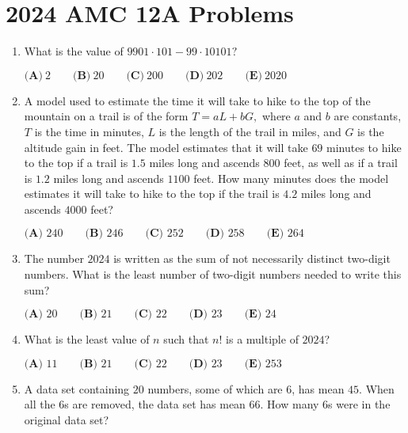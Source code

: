 \documentclass{article}
\begin{document}
\newpage\section*{2024 AMC 12A Problems}

\begin{enumerate}[label=\arabic*., itemsep=0.5em]
\item What is the value of \(9901\cdot101-99\cdot10101?\)

\(\textbf{(A)}~2\qquad\textbf{(B)}~20\qquad\textbf{(C)}~200\qquad\textbf{(D)}~202\qquad\textbf{(E)}~2020\)\par \vspace{0.5em}\item A model used to estimate the time it will take to hike to the top of the mountain on a trail is of the form \(T=aL+bG,\) where \(a\) and \(b\) are constants, \(T\) is the time in minutes, \(L\) is the length of the trail in miles, and \(G\) is the altitude gain in feet. The model estimates that it will take \(69\) minutes to hike to the top if a trail is \(1.5\) miles long and ascends \(800\) feet, as well as if a trail is \(1.2\) miles long and ascends \(1100\) feet. How many minutes does the model estimates it will take to hike to the top if the trail is \(4.2\) miles long and ascends \(4000\) feet?

\(\textbf{(A) }240\qquad\textbf{(B) }246\qquad\textbf{(C) }252\qquad\textbf{(D) }258\qquad\textbf{(E) }264\)\par \vspace{0.5em}\item The number \(2024\) is written as the sum of not necessarily distinct two-digit numbers. What is the least number of two-digit numbers needed to write this sum?

\(\textbf{(A) }20\qquad\textbf{(B) }21\qquad\textbf{(C) }22\qquad\textbf{(D) }23\qquad\textbf{(E) }24\)\par \vspace{0.5em}\item What is the least value of \(n\) such that \(n!\) is a multiple of \(2024\)?

\(
\textbf{(A) }11 \qquad
\textbf{(B) }21 \qquad
\textbf{(C) }22 \qquad
\textbf{(D) }23 \qquad
\textbf{(E) }253 \qquad
\)\par \vspace{0.5em}\item A data set containing \(20\) numbers, some of which are \(6\), has mean \(45\). When all the 6s are removed, the data set has mean \(66\). How many 6s were in the original data set?


\end{enumerate}
\end{document}

